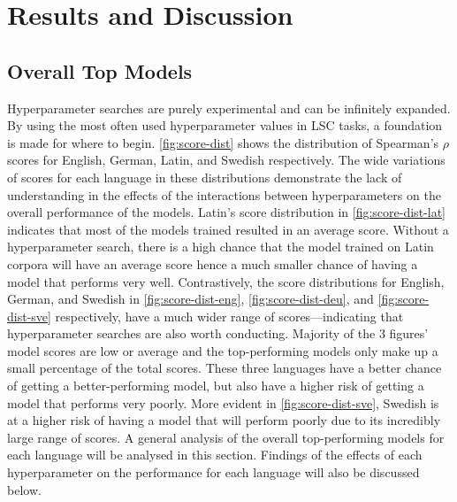 \section{Results and Discussion}
\label{sec:results}

\subsection{Overall Top Models}

Hyperparameter searches are purely experimental and can be infinitely expanded. By using the most often used hyperparameter values in LSC tasks, a foundation is made for where to begin. \autoref{fig:score-dist} shows the distribution of Spearman's $\rho$ scores for English, German, Latin, and Swedish respectively. The wide variations of scores for each language in these distributions demonstrate the lack of understanding in the effects of the interactions between hyperparameters on the overall performance of the models. Latin's score distribution in \autoref{fig:score-dist-lat} indicates that most of the models trained resulted in an average score. Without a hyperparameter search, there is a high chance that the model trained on Latin corpora will have an average score hence a much smaller chance of having a model that performs very well. Contrastively, the score distributions for English, German, and Swedish in  \autoref{fig:score-dist-eng}, \autoref{fig:score-dist-deu}, and \autoref{fig:score-dist-sve} respectively, have a much wider range of scores⁠⁠—indicating that hyperparameter searches are also worth conducting. Majority of the 3 figures' model scores are low or average and the top-performing models only make up a small percentage of the total scores. These three languages have a better chance of getting a better-performing model, but also have a higher risk of getting a model that performs very poorly. More evident in \autoref{fig:score-dist-sve}, Swedish is at a higher risk of having a model that will perform poorly due to its incredibly large range of scores. A general analysis of the overall top-performing models for each language will be analysed in this section. Findings of the effects of each hyperparameter on the performance for each language will also be discussed below. 

